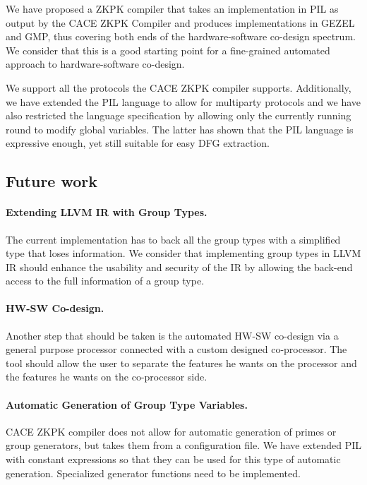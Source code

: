 We have proposed a ZKPK compiler that takes an implementation in PIL
as output by the CACE ZKPK Compiler and produces implementations in
GEZEL and GMP, thus covering both ends of the hardware-software
co-design spectrum. We consider that this is a good starting point for
a fine-grained automated approach to hardware-software co-design.

We support all the protocols the CACE ZKPK compiler
supports. Additionally, we have extended the PIL language to allow for
multiparty protocols and we have also restricted the language
specification by allowing only the currently running round to modify
global variables. The latter has shown that the PIL language is
expressive enough, yet still suitable for easy DFG extraction.

\subsection{Future work}

\paragraph{Extending LLVM IR with Group Types.}
The current implementation has to back all the group types with a
simplified type that loses information. We consider that implementing
group types in LLVM IR should enhance the usability and security of
the IR by allowing the back-end access to the full information of
a group type.

\paragraph{HW-SW Co-design.}
Another step that should be taken is the automated HW-SW co-design via
a general purpose processor connected with a custom designed
co-processor. The tool should allow the user to separate the features
he wants on the processor and the features he wants on the
co-processor side.

\paragraph{Automatic Generation of Group Type Variables.}
CACE ZKPK compiler does not allow for automatic generation of primes
or group generators, but takes them from a configuration file. We have
extended PIL with constant expressions so that they can be used for
this type of automatic generation. Specialized generator functions
need to be implemented.

